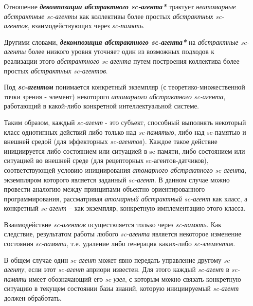 
\begin{SCn}
\end{SCn}

Отношение \textbf{\textit{декомпозиции абстрактного sc-агента*}} трактует \textit{неатомарные абстрактные sc-агенты} как коллективы более простых \textit{абстрактных sc-агентов}, взаимодействующих через \textit{sc-память}.
	
Другими словами, \textbf{\textit{декомпозиция абстрактного sc-агента*}} на \textit{абстрактные sc-агенты} более низкого уровня уточняет один из возможных подходов к реализации этого \textit{абстрактного sc-агента} путем построения коллектива более простых \textit{абстрактных sc-агентов}.

\begin{SCn}
\end{SCn}

Под \textbf{\textit{sc-агентом}} понимается конкретный экземпляр (с теоретико-множественной точки зрения - элемент) некоторого \textit{атомарного абстрактного sc-агента}, работающий в какой-либо конкретной интеллектуальной системе.
	
Таким образом, каждый \textit{sc-агент} - это субъект, способный выполнять некоторый класс однотипных действий либо только над \textit{sc-памятью}, либо над sc-памятью и внешней средой (для эффекторных \textit{sc-агентов}). Каждое такое действие инициируется либо состоянием или ситуацией в sc-памяти, либо состоянием или ситуацией во внешней среде (для рецепторных sc-агентов-датчиков),  соответствующей условию инициирования \textit{атомарного абстрактного sc-агента}, экземпляром которого является заданный \textit{sc-агент}. В данном случае можно провести аналогию между принципами объектно-ориентированного программирования, рассматривая \textit{атомарный абстрактный sc-агент} как класс, а конкретный \textit{sc-агент} – как экземпляр, конкретную имплементацию этого класса.
	
Взаимодействие \textit{sc-агентов} осуществляется только через \textit{sc-память}. Как следствие, результатом работы любого \textit{sc-агента} является некоторое изменение состояния \textit{sc-памяти}, т.е. удаление либо генерация каких-либо \textit{sc-элементов}.
	
В общем случае один \textit{sc-агент} может явно передать управление другому \textit{sc-агенту}, если этот \textit{sc-агент} априори известен. Для этого каждый \textit{sc-агент} в \textit{sc-памяти} имеет обозначающий его \textit{sc-узел}, с которым можно связать конкретную ситуацию в текущем состоянии базы знаний, которую инициируемый \textit{sc-агент} должен обработать.
	
